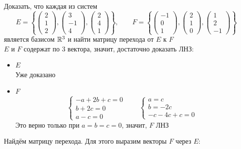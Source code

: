 Доказать, что каждая из систем
$$ E = \left\{
\begin{pmatrix}
	2 \\
    1 \\
    2
\end{pmatrix},
\begin{pmatrix}
	3 \\
    -1 \\
    4
\end{pmatrix},
\begin{pmatrix}
	2 \\
    4 \\
    1
\end{pmatrix} \right\}, \qquad F = \left\{
\begin{pmatrix}
	-1 \\
    0 \\
    1
\end{pmatrix},
\begin{pmatrix}
	2 \\
    1 \\
    0
\end{pmatrix},
\begin{pmatrix}
	1 \\
    2 \\
    -1
\end{pmatrix} \right\} $$
является базисом $ \mathbb{R}^3 $ и найти матрицу перехода от $ E $ к $ F $ \\
$ E $ и $ F $ содержат по 3 вектора, значит, достаточно доказать ЛНЗ:
\begin{itemize}
	\item $ E $ \\
    Уже доказано
    \item $ F $
    $$
    \begin{cases}
    	-a + 2b + c = 0 \\
        b + 2c = 0 \\
        a - c = 0
    \end{cases} \qquad
    \begin{cases}
    	a = c \\
        b = -2c \\
        -c - 4c + c = 0
    \end{cases} $$
    Это верно только при $ a = b = c = 0 $, значит, $ F $ ЛНЗ
\end{itemize}
Найдём матрицу перехода. Для этого выразим векторы $ F $ через $ E $:
